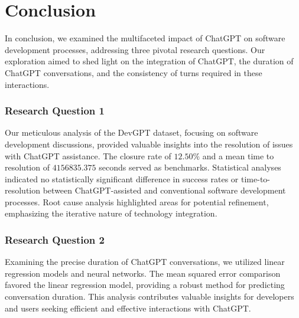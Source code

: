 \documentclass[journal]{IEEEtran}
\begin{document}
\section{Conclusion}
In conclusion, we examined the multifaceted impact of ChatGPT on software development processes, addressing three pivotal research questions. Our exploration aimed to shed light on the integration of ChatGPT, the duration of ChatGPT conversations, and the consistency of turns required in these interactions.
\\
\subsubsection{Research Question 1}Our meticulous analysis of the DevGPT dataset, focusing on software development discussions, provided valuable insights into the resolution of issues with ChatGPT assistance. The closure rate of $12.50\%$ and a mean time to resolution of $4156835.375$ seconds served as benchmarks. Statistical analyses indicated no statistically significant difference in success rates or time-to-resolution between ChatGPT-assisted and conventional software development processes. Root cause analysis highlighted areas for potential refinement, emphasizing the iterative nature of technology integration.
\\
\subsubsection{Research Question 2}Examining the precise duration of ChatGPT conversations, we utilized linear regression models and neural networks. The mean squared error comparison favored the linear regression model, providing a robust method for predicting conversation duration. This analysis contributes valuable insights for developers and users seeking efficient and effective interactions with ChatGPT.
\\
\end{document}
